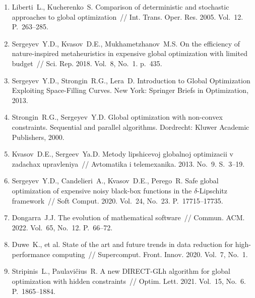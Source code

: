 \documentclass[a4paper,12pt,russian]{article}
\begin{document}
\begin{enumerate}
\item \label{rfa:enlit:Liberti2005}
Liberti~L., Kucherenko~S. Comparison of deterministic and stochastic approaches to global optimization~// Int. Trans. Oper. Res. 2005. Vol.~12. P.~263--285.

\item \label{rfa:enlit:Sergeyev2018}
Sergeyev~Y.D., Kvasov~D.E., Mukhametzhanov~M.S. On the efficiency of nature-inspired metaheuristics in expensive global optimization with limited budget~// Sci. Rep. 2018. Vol.~8, No.~1. p.~435.

\item \label{rfa:enlit:Sergeyev2013}
Sergeyev~Y.D., Strongin~R.G., Lera~D. Introduction to Global Optimization Exploiting Space-Filling Curves. New York: Springer Briefs in Optimization, 2013. %

\item \label{rfa:enlit:Strongin2000}
Strongin~R.G., Sergeyev~Y.D. Global optimization with non-convex constraints. Sequential and parallel algorithms. Dordrecht: Kluwer Academic Publishers, 2000.

\item \label{rfa:enlit:Kvasov2013}
Kvasov~D.E., Sergeev~Ya.D. Metody lipshicevoj globalnoj optimizacii v zadachax upravleniya~// Avtomatika i telemexanika. 2013. No.~9. S.~3--19.

\item \label{rfa:enlit:Sergeyev2020}
Sergeyev~Y.D., Candelieri~A., Kvasov~D.E., Perego~R. Safe global optimization of expensive noisy black-box functions in the $\delta$-Lipschitz framework~// 
Soft Comput. 2020. Vol.~24, No.~23. P.~17715--17735. %

\item \label{rfa:enlit:Dongarra2022}
Dongarra~J.J. The evolution of mathematical software~// Commun. ACM. 2022. Vol.~65, No.~12. P.~66--72. %

\item \label{rfa:enlit:Duwe2020}
Duwe~K., et al. State of the art and future trends in data reduction for high-performance computing~// Supercomput. Front. Innov. 2020. Vol.~7, No.~1. %

\item \label{rfa:enlit:Stripinis2021}
Stripinis~L., Paulavi{\v c}ius~R. A new {DIRECT}-{GLh} algorithm for global optimization with hidden constraints~// Optim. Lett. 2021. Vol.~15, No.~6. P.~1865--1884.


\end{enumerate}
\end{document}
